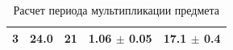 \begin{table}[]
\begin{tabular}{|c|c|c|l|l|}
3                                                                    & 24.0                                                                                                          & 21                                                                                             & 1.06 $\pm$ 0.05                                                                                                                                & 17.1 $\pm$ 0.4                                                                                         \\ \hline
\end{tabular}
\caption{Расчет периода мультипликации предмета}
\label{tab:C1}
\end{table}